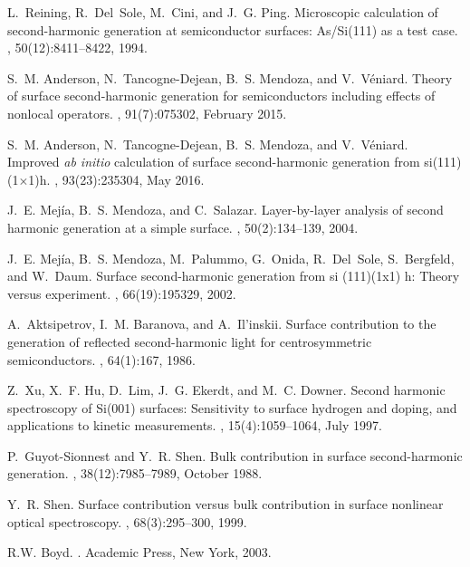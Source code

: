 \documentclass[aps,prb,10pt,showpacs,letterpaper,twocolumn]{revtex4-1}
\begin{document}
\begin{thebibliography}{10}
L.~Reining, R.~Del~Sole, M.~Cini, and J.~G. Ping.
\newblock Microscopic calculation of second-harmonic generation at
  semiconductor surfaces: {As/Si(111)} as a test case.
, 50(12):8411--8422, 1994.

S.~M. Anderson, N.~Tancogne-Dejean, B.~S. Mendoza, and V.~V{\'e}niard.
\newblock Theory of surface second-harmonic generation for semiconductors
  including effects of nonlocal operators.
, 91(7):075302, February 2015.

S.~M. Anderson, N.~Tancogne-Dejean, B.~S. Mendoza, and V.~V{\'e}\-niard.
\newblock Improved \emph{ab initio} calculation of surface second-harmonic
  generation from si(111)(1{$\times$}1)h.
, 93(23):235304, May 2016.

J.~E. Mej{\'i}a, B.~S. Mendoza, and C.~Salazar.
\newblock Layer-by-layer analysis of second harmonic generation at a simple
  surface.
, 50(2):134--139, 2004.

J.~E. Mej{\'i}a, B.~S. Mendoza, M.~Palummo, G.~Onida, R.~Del~Sole, S.~Bergfeld,
  and W.~Daum.
\newblock Surface second-harmonic generation from si (111)(1x1) h: Theory
  versus experiment.
, 66(19):195329, 2002.

A.~Aktsipetrov, I.~M. Baranova, and A.~Il'inskii.
\newblock Surface contribution to the generation of reflected second-harmonic
  light for centrosymmetric semiconductors.
, 64(1):167, 1986.

Z.~Xu, X.~F. Hu, D.~Lim, J.~G. Ekerdt, and M.~C. Downer.
\newblock Second harmonic spectroscopy of {Si}(001) surfaces: {Sensitivity} to
  surface hydrogen and doping, and applications to kinetic measurements.
, 15(4):1059--1064, July 1997.

P.~Guyot-Sionnest and Y.~R. Shen.
\newblock Bulk contribution in surface second-harmonic generation.
, 38(12):7985--7989, October 1988.

Y.~R. Shen.
\newblock Surface contribution versus bulk contribution in surface nonlinear
  optical spectroscopy.
, 68(3):295--300, 1999.

R.W. Boyd.
.
\newblock Academic Press, New York, 2003.


\end{thebibliography}
\end{document}
